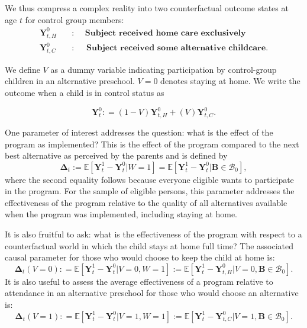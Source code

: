 We thus compress a complex reality into two counterfactual outcome states at age $t$ for control group members:
\begin{align*}
\bm{Y}_{t,H}^0 \quad &: \quad \textbf{ Subject received home care exclusively} \\
\bm{Y}_{t,C}^0 \quad &: \quad \textbf{ Subject received some alternative childcare}.
\end{align*}

We define $V$ as a dummy variable indicating participation by control-group children in an alternative preschool. $V=0$ denotes staying at home. We write the outcome when a child is in control status as 

\begin{equation}
\bm{Y}^0_t : = \left( 1 - V \right) \bm{Y}^0_{t,H} + \left( V \right) \bm{Y}^0_{t,C}.
\end{equation}

One parameter of interest addresses the question: what is the effect of the program as implemented? This is the effect of the program compared to the next best alternative as perceived by the parents and is defined by
\begin{equation}\label{eq:effect}
\bm{\Delta}_t := \mathbb{E} \left[ \bm{Y}^1_t -  \bm{Y}^0_t | W =1 \right] = \mathbb{E} \left[\bm{Y}^1_t - \bm{Y}^0_t | \bm{B} \in \mathcal{B}_0 \right],
\end{equation}
where the second equality follows because everyone eligible wants to participate in the program. For the sample of eligible persons, this parameter addresses the effectiveness of the program relative to the quality of all alternatives available when the program was implemented, including staying at home.

It is also fruitful to ask: what is the effectiveness of the program with respect to a counterfactual world in which the child stays at home full time? The associated causal parameter for those who would choose to keep the child at home is:
\begin{equation}\label{eq:influenza}
\bm{\Delta}_t \left(V = 0 \right) : =   \mathbb{E} \left[ \bm{Y}^1_t - \bm{Y}^0_t | V = 0, W = 1 \right] := \mathbb{E} \left[\bm{Y}^1_{t} - \bm{Y}^0_{t,H} | V = 0, \bm{B} \in \mathcal{B}_0 \right].
\end{equation}
It is also useful to assess the average effectiveness of a program relative to attendance in an alternative preschool for those who would choose an alternative is:
\begin{equation}\label{eq:smallpox}
\bm{\Delta}_t \left( V =1 \right) : =   \mathbb{E} \left[ \bm{Y}^1_t - \bm{Y}^0_t | V = 1, W = 1 \right] := \mathbb{E} \left[\bm{Y}^1_t - \bm{Y}^0_{t,C} | V = 1, \bm{B} \in \mathcal{B}_0 \right].
\end{equation}

